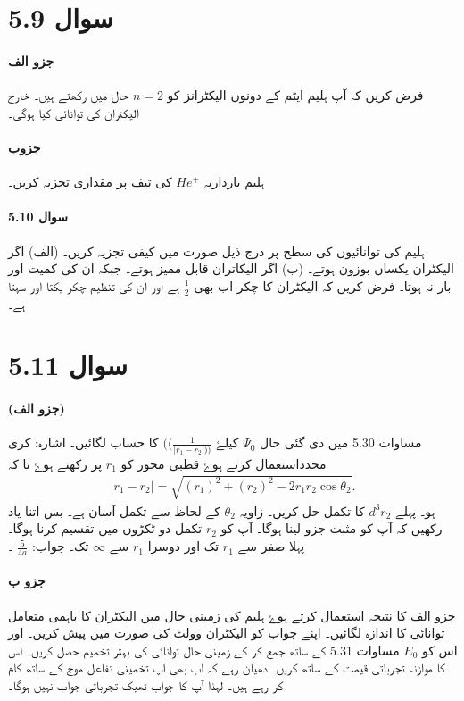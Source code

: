 \section*{سوال 5.9}
\paragraph*{جزو الف}
فرض کریں کہ آپ ہلیم ایٹم کے دونوں الیکٹرانز کو $ n=2 $ حال میں رکھتے ہیں۔ خارج الیکٹران کی توانائی کیا ہوگی۔
\paragraph*{جزوب}
ہلیم بارداریہ $ He^+ $ کی تیف پر مقداری تجزیہ کریں۔ 
\paragraph*{سوال 5.10}
ہلیم کی توانائیوں کی سطح پر درج ذیل صورت میں کیفی تجزیہ کریں۔ (الف) اگر الیکٹران یکساں بوزون ہوتے۔ (ب) اگر الیکاتران قابل ممیز ہوتے۔ جبکہ ان کی کمیت اور بار نہ ہوتا۔ فرض کریں کہ الیکٹران کا چکر اب بھی $ \frac{1}{2} $ 
ہے اور ان کی تنظیم چکر یکتا اور سہتا ہے۔
\section*{سوال 5.11}
\paragraph*{(جزو الف)}
مساوات 5.30 میں دی گئی حال $ \Psi_{0} $  کیلۓ  $ ((\frac{1}{|r_{1} - r_{2} |))} $ کا حساب لگائیں۔ اشارہ: کری محدداستعمال کرتے ہوۓ قطبی محور کو $ r_{1} $ پر رکھتے ہوۓ تا کہ
\begin{align}
|r_{1}-r_{2}|= \sqrt{(r_{1})^2+ (r_{2})^2 -2r_{1} r_{2}\cos\theta_{2}}.
\end{align}
ہو۔ پہلے 
$ d^3 r_{2} $
  کا تکمل حل کریں۔ زاویہ 
  $ \theta_{2} $
   کے لحاظ سے تکمل آسان ہے۔ بس اتنا یاد رکھیں کہ آپ کو مثبت جزو لینا ہوگا۔ آپ کو  
   $ r_{2} $
    تکمل دو ٹکڑوں میں تقسیم کرنا ہوگا۔ پہلا صفر سے 
    $ r_{1} $ 
    تک اور دوسرا 
     $ r_{1} $ سے $ \infty $ تک۔ جواب: $\frac{5}{4a} $ ۔ 
\paragraph*{جزو ب}
جزو الف کا نتیجہ استعمال کرتے ہوۓ ہلیم کی زمینی حال میں الیکٹران کا باہمی متعامل توانائی کا اندازہ لگائیں۔ اپنے جواب کو الیکٹران وولٹ کی صورت میں پیش کریں۔ اور اس کو $ E_{0} $ مساوات 5.31 کے ساتھ جمع کر کے زمینی حال توانائی کی بہتر تخمیم حصل کریں۔ اس کا موازنہ تجرباتی قیمت کے ساتھ کریں۔ دھیان رہے کہ اب بھی آپ تخمینی تفاعل موج کے ساتھ کام کر رہے ہیں۔ لہذا آپ کا جواب ٹھیک تجرباتی جواب نہیں ہوگا۔  



